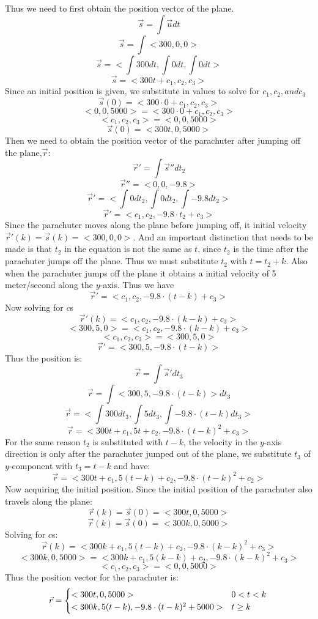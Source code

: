 \documentclass[a4paper, 12pt]{article}
\begin{document}
		Thus we need to first obtain the position vector of the plane.
		$$\vec{s} = \int \vec{u} dt$$
		$$\vec{s} = \int <300,0,0>$$
		$$\vec{s} = <\int 300 dt,\int 0 dt,\int 0 dt>$$
		$$\vec{s} = <300t+c_1,c_2,c_3>$$
		Since an initial position is given, we substitute in values to solve for $c_1,c_2, and c_3$
		$$\vec{s}(0) = <300\cdot 0 + c_1,c_2,c_3>$$
		$$<0,0,5000> = <300\cdot 0 + c_1,c_2,c_3>$$
		$$<c_1, c_2, c_3> = <0,0,5000>$$
		$$\vec{s}(0) = <300t,0,5000>$$
		Then we need to obtain the position vector of the parachuter after jumping off the plane,$\vec{r}$:
		$$\vec{r}' = \int \vec{s}'' dt_2$$
		$$\vec{r}'' = <0,0,-9.8>$$ 
		$$\vec{r}' = <\int 0 dt_2, \int 0 dt_2,\int -9.8 dt_2>$$
		$$\vec{r}' = <c_1, c_2,-9.8\cdot t_2 +c_3>$$
		Since the parachuter moves along the plane before jumping off, it initial velocity $\vec{r}'(k) = \vec{s}(k) = <300,0,0>$. And an important distinction that needs to be made is that $t_2$ in the equation is not the same as $t$, since $t_2$ is the time after the parachuter jumps off the plane. Thus we must substitute $t_2$ with $t = t_2 + k$. Also when the parachuter jumps off the plane it obtains a initial velocity of 5 meter/second along the $y$-axis. Thus we have 
		$$\vec{r}' = <c_1, c_2,-9.8\cdot (t-k) +c_3>$$
		Now solving for $c$s
		$$\vec{r}'(k) = <c_1, c_2,-9.8\cdot (k-k) +c_3>$$
		$$<300,5,0> = <c_1, c_2,-9.8\cdot (k-k) +c_3>$$
		$$<c_1, c_2, c_3> = <300,5,0>$$
		$$\vec{r}' = <300, 5,-9.8\cdot (t-k)>$$
		Thus the position is:
		$$\vec{r} = \int \vec{s}' dt_3$$
		$$\vec{r} = \int <300, 5,-9.8\cdot (t-k)>dt_3$$
		$$\vec{r} = <\int 300 dt_3, \int 5 dt_3,\int -9.8\cdot (t-k) dt_3>$$
		$$\vec{r} = <300t +c_1, 5t + c_2, -9.8\cdot (t-k)^2+c_3>$$
		For the same reason $t_2$ is substituted with $t-k$, the velocity in the $y$-axis direction is only after the parachuter jumped out of the plane, we substitute $t_3$ of $y$-component with $t_3 = t-k$ and have:
		$$\vec{r} = <300t +c_1, 5(t-k) + c_2, -9.8\cdot (t-k)^2+c_2>$$
		Now acquiring the initial position. Since the initial position of the parachuter also travels along the plane:
		$$\vec{r}(k) =\vec{s}(0) = <300t,0,5000>$$
		$$\vec{r}(k) =\vec{s}(0) = <300k,0,5000>$$
		Solving for $c$s:
		$$\vec{r}(k) = <300k +c_1, 5(t-k) + c_2, -9.8\cdot (k-k)^2+c_3>$$
		$$<300k,0,5000> = <300k +c_1, 5(k-k) + c_2, -9.8\cdot (k-k)^2+c_3>$$
		$$<c_1, c_2, c_3> = <0,0,5000>$$
		Thus the position vector for the parachuter is:
		\begin{equation}
 			\vec{r} = \begin{cases}
  			<300t,0,5000>  & 0 < t < k \\
 			<300k , 5(t-k), -9.8\cdot (t-k)^2+5000>                                       & t \geq k
  			\end{cases} \\
		\end{equation}
		
\end{document}

